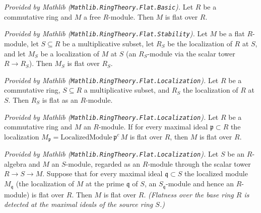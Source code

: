 \begin{lemma}
  \label{lem:mathlib_flat_of_free}
  \mathlibok
  \textit{Provided by Mathlib (\texttt{Mathlib.RingTheory.Flat.Basic}).}
  Let \(R\) be a commutative ring and \(M\) a free \(R\)-module. Then \(M\) is flat
  over \(R\).
\end{lemma}

\begin{lemma}
  \label{lem:mathlib_flat_localization_preserves}
  \mathlibok
  \textit{Provided by Mathlib (\texttt{Mathlib.RingTheory.Flat.Stability}).}
  Let \(M\) be a flat \(R\)-module, let \(S \subseteq R\) be a multiplicative subset,
  let \(R_S\) be the localization of \(R\) at \(S\), and let \(M_S\) be a localization
  of \(M\) at \(S\) (an \(R_S\)-module via the scalar tower \(R \to R_S\)). Then
  \(M_S\) is flat over \(R_S\).
\end{lemma}

\begin{lemma}
  \label{lem:mathlib_localization_flat}
  \mathlibok
  \textit{Provided by Mathlib (\texttt{Mathlib.RingTheory.Flat.Localization}).}
  Let \(R\) be a commutative ring, \(S \subseteq R\) a multiplicative subset, and
  \(R_S\) the localization of \(R\) at \(S\). Then \(R_S\) is flat as an
  \(R\)-module.
\end{lemma}

\begin{lemma}
  \label{lem:mathlib_flat_of_localized_maximal}
  \mathlibok
  \textit{Provided by Mathlib (\texttt{Mathlib.RingTheory.Flat.Localization}).}
  Let \(R\) be a commutative ring and \(M\) an \(R\)-module. If for every maximal
  ideal \(\mathfrak p \subset R\) the localization
  \(M_{\mathfrak p} = \mathrm{LocalizedModule}\,\mathfrak p^c\, M\) is flat over \(R\),
  then \(M\) is flat over \(R\).
\end{lemma}

\begin{lemma}
  \label{lem:mathlib_flat_of_isLocalized_maximal}
  \mathlibok
  \textit{Provided by Mathlib (\texttt{Mathlib.RingTheory.Flat.Localization}).}
  Let \(S\) be an \(R\)-algebra and \(M\) an \(S\)-module, regarded as an
  \(R\)-module through the scalar tower \(R \to S \to M\). Suppose that for every
  maximal ideal \(\mathfrak q \subset S\) the localized module \(M_{\mathfrak q}\)
  (the localization of \(M\) at the prime \(\mathfrak q\) of \(S\), an
  \(S_{\mathfrak q}\)-module and hence an \(R\)-module) is flat over \(R\). Then
  \(M\) is flat over \(R\). \emph{(Flatness over the base ring \(R\) is detected at
  the maximal ideals of the source ring \(S\).)}
\end{lemma}

